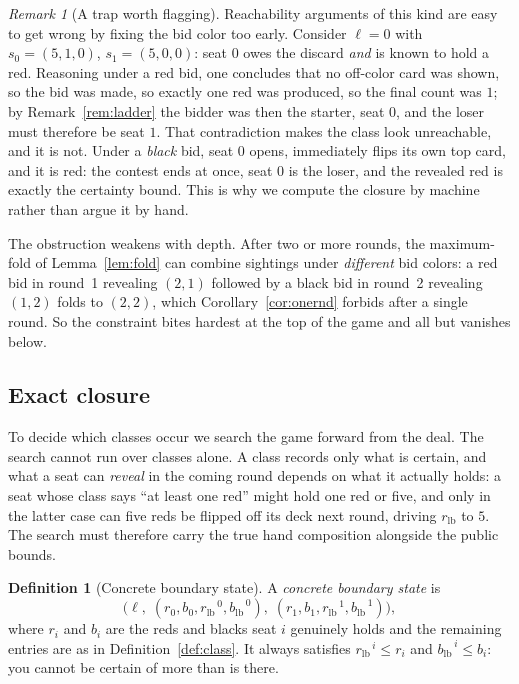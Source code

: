 \documentclass[11pt]{article}
\theoremstyle{plain}
\theoremstyle{definition}
\newtheorem{definition}[theorem]{Definition}
\theoremstyle{remark}
\newtheorem{remark}[theorem]{Remark}
\newcommand{\seat}[1]{\ensuremath{s_{#1}}}
\newcommand{\rlb}{\ensuremath{r_{\mathrm{lb}}}}
\newcommand{\blb}{\ensuremath{b_{\mathrm{lb}}}}
\begin{document}
\begin{remark}[A trap worth flagging]\label{rem:trap}
Reachability arguments of this kind are easy to get wrong by fixing the bid
color too early. Consider $\ell=0$ with $\seat{0}=(5,1,0)$,
$\seat{1}=(5,0,0)$: seat $0$ owes the discard \emph{and} is known to hold a
red. Reasoning under a red bid, one concludes that no off-color card was
shown, so the bid was made, so exactly one red was produced, so the final
count was $1$; by Remark~\ref{rem:ladder} the bidder was then the starter,
seat $0$, and the loser must therefore be seat $1$. That contradiction
makes the class look unreachable, and it is not. Under a \emph{black} bid,
seat $0$ opens, immediately flips its own top card, and it is red: the
contest ends at once, seat $0$ is the loser, and the revealed red is
exactly the certainty bound. This is why we compute the closure by machine
rather than argue it by hand.
\end{remark}

The obstruction weakens with depth. After two or more rounds, the
maximum-fold of Lemma~\ref{lem:fold} can combine sightings under
\emph{different} bid colors: a red bid in round~1 revealing $(2,1)$
followed by a black bid in round~2 revealing $(1,2)$ folds to $(2,2)$,
which Corollary~\ref{cor:onernd} forbids after a single round. So the
constraint bites hardest at the top of the game and all but vanishes below.

\subsection{Exact closure}\label{sec:closure}

To decide which classes occur we search the game forward from the deal. The
search cannot run over classes alone. A class records only what is certain,
and what a seat can \emph{reveal} in the coming round depends on what it
actually holds: a seat whose class says ``at least one red'' might hold one
red or five, and only in the latter case can five reds be flipped off its
deck next round, driving $\rlb$ to $5$. The search must therefore carry the
true hand composition alongside the public bounds.

\begin{definition}[Concrete boundary state]\label{def:concrete}
A \emph{concrete boundary state} is
\[
  \bigl(\ell,\;(r_0,b_0,\rlb^{\,0},\blb^{\,0}),\;
              (r_1,b_1,\rlb^{\,1},\blb^{\,1})\bigr),
\]
where $r_i$ and $b_i$ are the reds and blacks seat $i$ genuinely holds and
the remaining entries are as in Definition~\ref{def:class}. It always
satisfies $\rlb^{\,i}\le r_i$ and $\blb^{\,i}\le b_i$: you cannot be certain
of more than is there.
\end{definition}
\end{document}

